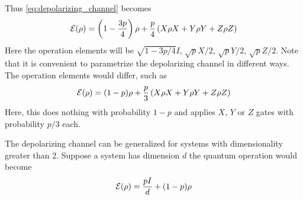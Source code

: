 Thus \ref{eq:depolarizing_channel} becomes
\begin{equation}
    \operatorname{\mathcal{E}}(\rho) = \left( 1-\frac{3p}{4} \right) \rho + \frac{p}{4}\left( X \rho X + Y \rho Y + Z \rho Z \right)
\end{equation}
Here the operation elements will be $\sqrt{1-3p/4}I$, $\sqrt{p}X/2$, $\sqrt{p}Y/2$, $\sqrt{p}Z/2$. Note that it is convenient to parametrize the depolarizing channel in different ways. The operation elements would differ, such as
\begin{equation}
    \operatorname{\mathcal{E}}(\rho) = (1-p)\rho + \frac{p}{3}\left(X \rho X + Y \rho Y + Z \rho Z \right)
\end{equation}
Here, this does nothing with probability $1-p$ and applies $X$, $Y$ or $Z$ gates with probability $p/3$ each.

The depolarizing channel can be generalized for systems with dimensionality greater than 2. Suppose a system has dimension $d$ the quantum operation would become
\begin{equation}
    \operatorname{\mathcal{E}}(\rho) = \frac{pI}{d} + (1-p)\rho
\end{equation}
